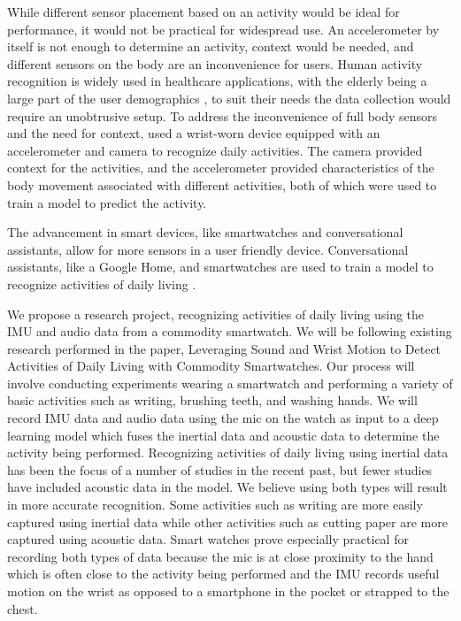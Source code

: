 \documentclass[conference]{IEEEtran}
\begin{document}
	While different sensor placement based on an activity would be ideal for performance, it would not be practical for widespread use.
	An accelerometer by itself is not enough to determine an activity, context would be needed, and different sensors on the body are an inconvenience for users. 
	Human activity recognition is widely used in healthcare applications, with the elderly being a large part of the user demographics \cite{2018_Robust_Activity}, to suit their needs the data collection would require an unobtrusive setup.
	To address the inconvenience of full body sensors and the need for context, \cite{2012_WristSense} used a wrist-worn device equipped with an accelerometer and camera to recognize daily activities. 
	The camera provided context for the activities, and the accelerometer provided characteristics of the body movement associated with different activities, both of which were used to train a model to predict the activity.
	
	The advancement in smart devices, like smartwatches and conversational assistants, allow for more sensors in a user friendly device.
	Conversational assistants, like a Google Home, and smartwatches are used to train a model to recognize activities of daily living \cite{2021_Ok_Google} \cite{2022_Leveraging_sound}.
	
	
	
	We propose a research project, recognizing activities of daily living using the IMU and audio data from a commodity smartwatch. We will be following existing research performed in the paper, Leveraging Sound and Wrist Motion to Detect Activities of Daily Living with Commodity Smartwatches. Our process will involve conducting experiments wearing a smartwatch and performing a variety of basic activities such as writing, brushing teeth, and washing hands. We will record IMU data and audio data using the mic on the watch as input to a deep learning model which fuses the inertial data and acoustic data to determine the activity being performed. Recognizing activities of daily living using inertial data has been the focus of a number of studies in the recent past, but fewer studies have included acoustic data in the model. We believe using both types will result in more accurate recognition. Some activities such as writing are more easily captured using inertial data while other activities such as cutting paper are more captured using acoustic data.  Smart watches prove especially practical for recording both types of data because the mic is at close proximity to the hand which is often close to the activity being performed and the IMU records useful motion on the wrist as opposed to a smartphone in the pocket or strapped to the chest.
	
\end{document}

